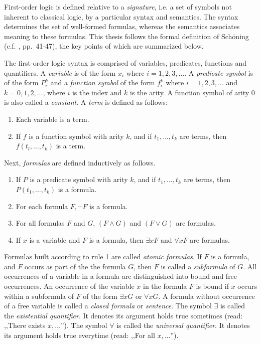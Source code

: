 First-order logic is defined relative to a \textit{signature}, i.e. a set of symbols not inherent to classical logic, by a particular syntax and semantics.
The syntax determines the set of well-formed formulas, whereas the semantics associates meaning to these formulas.
This thesis follows the formal definition of Schöning (c.f. \cite{schoning2008logic}, pp.~41-47), the key points of which are summarized below.

The first-order logic syntax is comprised of variables, predicates, functions and quantifiers.
A \textit{variable} is of the form $x_i$ where $i= 1, 2, 3, \ldots$.
A \textit{predicate symbol} is of the form $P_i^k$ and a \textit{function symbol} of the form $f_i^k$ where $i = 1, 2, 3 , \ldots$ and
$k = 0, 1, 2, \ldots$, where $i$ is the index and $k$ is the arity.
A function symbol of arity 0 is also called a \textit{constant}.
A \textit{term} is defined as follows:

\begin{enumerate}
    \item Each variable is a term.
    \item If $f$ is a function symbol with arity $k$, and if $t_1, \ldots, t_k$ are terms, then $f(t_l, \ldots, t_k)$ is a term.
\end{enumerate}

\noindent
Next, \textit{formulas} are defined inductively as follows.

\begin{enumerate}
    \item If $P$ is a predicate symbol with arity $k$, and if $t_1, \ldots ,t_k$ are terms, then $P(t_1 , \ldots, t_k )$ is a formula.
    \item For each formula $F, \lnot F$ is a formula.
    \item For all formulas $F$ and $G$, $(F \wedge G)$ and $(F \vee G)$ are formulas.
    \item If $x$ is a variable and $F$ is a formula, then $\exists xF$ and $\forall xF$ are formulas.
\end{enumerate}

Formulas built according to rule 1 are called \textit{atomic formulas}.
If $F$ is a formula, and $F$ occurs as part of the the formula $G$, then $F$ is called a \textit{subformula} of $G$.
All occurrences of a variable in a formula are distinguished into bound and free occurrences.
An occurrence of the variable $x$ in the formula $F$ is bound if $x$ occurs within a subformula of $F$ of the form $\exists xG$ or $\forall xG$.
A formula without occurrence of a free variable is called a \textit{closed formula} or \textit{sentence}.
The symbol $\exists$ is called the \textit{existential quantifier}.
It denotes its argument holds true sometimes (read: ,,There exists $x, \ldots$'').
The symbol $\forall$ is called the \textit{universal quantifier}.
It denotes its argument holds true everytime (read: ,,For all $x, \ldots$'').

